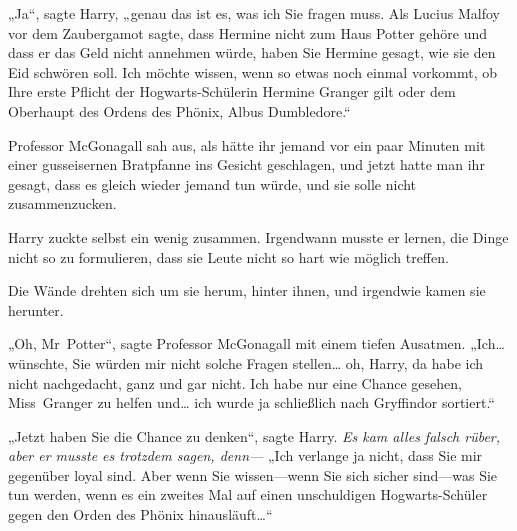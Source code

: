 „Ja“, sagte Harry, „genau das ist es, was ich Sie fragen muss. Als Lucius Malfoy vor dem Zaubergamot sagte, dass Hermine nicht zum Haus Potter gehöre und dass er das Geld nicht annehmen würde, haben Sie Hermine gesagt, wie sie den Eid schwören soll. Ich möchte wissen, wenn so etwas noch einmal vorkommt, ob Ihre erste Pflicht der Hogwarts-Schülerin Hermine Granger gilt oder dem Oberhaupt des Ordens des Phönix, Albus Dumbledore.“

Professor McGonagall sah aus, als hätte ihr jemand vor ein paar Minuten mit einer gusseisernen Bratpfanne ins Gesicht geschlagen, und jetzt hatte man ihr gesagt, dass es gleich wieder jemand tun würde, und sie solle nicht zusammenzucken.

Harry zuckte selbst ein wenig zusammen. Irgendwann musste er lernen, die Dinge nicht so zu formulieren, dass sie Leute nicht so hart wie möglich treffen.

Die Wände drehten sich um sie herum, hinter ihnen, und irgendwie kamen sie herunter.

„Oh, Mr~Potter“, sagte Professor McGonagall mit einem tiefen Ausatmen. „Ich… wünschte, Sie würden mir nicht solche Fragen stellen… oh, Harry, da habe ich nicht nachgedacht, ganz und gar nicht. Ich habe nur eine Chance gesehen, Miss~Granger zu helfen und… ich wurde ja schließlich nach Gryffindor sortiert.“

„Jetzt haben Sie die Chance zu denken“, sagte Harry. \emph{Es kam alles falsch rüber, aber er musste es trotzdem sagen, denn—} „Ich verlange ja nicht, dass Sie mir gegenüber loyal sind. Aber wenn Sie wissen—wenn Sie sich sicher sind—was Sie tun werden, wenn es ein zweites Mal auf einen unschuldigen Hogwarts-Schüler gegen den Orden des Phönix hinausläuft…“

